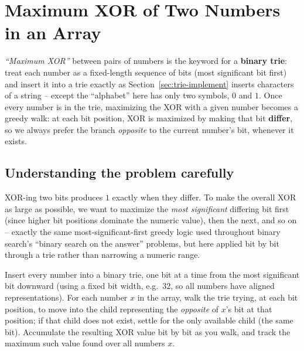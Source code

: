 \section{Maximum XOR of Two Numbers in an Array}
\label{sec:trie-max-xor}


\begin{patternbox}
\emph{``Maximum XOR''} between pairs of numbers is the keyword for a
\textbf{binary trie}: treat each number as a fixed-length sequence of
bits (most significant bit first) and insert it into a trie exactly as
Section~\ref{sec:trie-implement} inserts characters of a string -- except
the ``alphabet'' here has only two symbols, $0$ and $1$. Once every
number is in the trie, maximizing the XOR with a given number becomes a
greedy walk: at each bit position, XOR is maximized by making that bit
\textbf{differ}, so we always prefer the branch \emph{opposite} to the
current number's bit, whenever it exists.
\end{patternbox}

\subsection*{Understanding the problem carefully}

XOR-ing two bits produces $1$ exactly when they differ. To make the
overall XOR as large as possible, we want to maximize the \emph{most
significant} differing bit first (since higher bit positions dominate
the numeric value), then the next, and so on -- exactly the same
most-significant-first greedy logic used throughout binary search's
``binary search on the answer'' problems, but here applied bit by bit
through a trie rather than narrowing a numeric range.

\begin{ideabox}
Insert every number into a binary trie, one bit at a time from the most
significant bit downward (using a fixed bit width, e.g.\ $32$, so all
numbers have aligned representations). For each number $x$ in the array,
walk the trie trying, at each bit position, to move into the child
representing the \emph{opposite} of $x$'s bit at that position; if that
child does not exist, settle for the only available child (the same
bit). Accumulate the resulting XOR value bit by bit as you walk, and
track the maximum such value found over all numbers $x$.
\end{ideabox}

